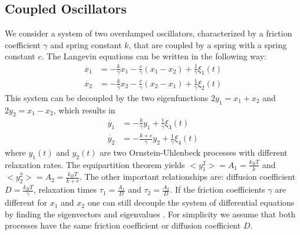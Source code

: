 \documentclass[%
 reprint,
 amsmath,amssymb,
 aps,
]{revtex4-1}
\begin{document}
\subsection{Coupled Oscillators}\label{sec_CO}
We consider a system of two overdamped oscillators, characterized by a friction coefficient $\gamma$ and spring constant $k$, that are coupled by a spring with a spring constant $c$.  The Langevin equations can be written in the following way:
\begin{equation}
	\begin{aligned}
		\dot{x_1} &= -\frac{k}{\gamma}x_{1}-\frac{c}{\gamma}(x_{1}-x_{2}) +\frac{1}{\gamma}\xi_{1}(t)\\
		\dot{x_2} &= -\frac{k}{\gamma}x_{2}-\frac{c}{\gamma}(x_{2}-x_{1}) +\frac{1}{\gamma}\xi_{2}(t)
	\end{aligned}
\end{equation}
This system can be decoupled by the two eigenfunctions $2y_{1}=x_{1}+x_{2}$ and $2y_{2}=x_{1}-x_{2}$, which results in
\begin{equation}\label{eq_decoupled}
	\begin{aligned}
		\dot{y_1} &= -\frac{k}{\gamma}y_{1} +\frac{1}{\gamma}\xi_{3}(t)\\
		\dot{y_2} &= -\frac{k+c}{\gamma}y_{2} +\frac{1}{\gamma}\xi_{4}(t)
	\end{aligned}
\end{equation}
where $y_{1}(t)$ and $y_{2}(t)$ are two Ornstein-Uhlenbeck processes with different relaxation rates.  The equipartition theorem yields $<y_{1}^{2}> = A_{1} = \frac{k_{B}T}{k}$ and $<y_{2}^{2}> = A_{2} = \frac{k_{B}T}{k+c}$.  The other important relationships are: diffusion coefficient $D=\frac{k_{B}T}{\gamma}$, relaxation times $\tau_{1}=\frac{A_{1}}{D}$ and $\tau_{2}=\frac{A_{2}}{D}$. If the friction coefficients $\gamma$ are different for $x_{1}$ and $x_{2}$ one can still decouple the system of differential equations by finding the eigenvectors and eigenvalues \cite{RN95}.  For simplicity we assume that both processes have the same friction coefficient or diffusion coefficient $D$.
\end{document}
